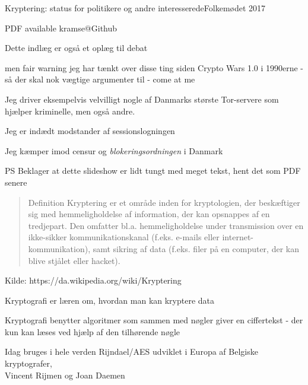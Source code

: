 \documentclass[20pt,landscape,a4paper,footrule]{foils}
\begin{document}

\mytitlepage
{Kryptering: status for politikere og andre interesserede}{Folkemødet 2017}

\centerline{\footnotesize
 PDF available kramse@Github}

\LogoOn

%


Dette indlæg er også et oplæg til debat

men fair warning jeg har tænkt over disse ting siden Crypto Wars
1.0 i 1990erne
- så der skal nok vægtige argumenter til - come at me \smiley

Jeg driver eksempelvis velvilligt nogle af Danmarks største Tor-servere
som hjælper kriminelle, men også andre.

Jeg er indædt modstander af sessionslogningen

Jeg kæmper imod censur og \emph{blokeringsordningen} i Danmark

PS Beklager at dette slideshow er lidt tungt med meget tekst, hent det som PDF senere


\begin{quote}
Definition
Kryptering er et område inden for kryptologien, der beskæftiger sig med
hemmeligholdelse af information, der kan opsnappes af en tredjepart. Den
omfatter bl.a. hemmeligholdelse under transmission over en ikke-sikker
kommunikationskanal (f.eks. e-mails eller internet-kommunikation), samt
sikring af data (f.eks. filer på en computer, der kan blive stjålet eller hacket).
\end{quote}
Kilde: https://da.wikipedia.org/wiki/Kryptering



\begin{list1}
\item Kryptografi er læren om, hvordan man kan kryptere data
\item Kryptografi benytter algoritmer som sammen med nøgler giver en
  ciffertekst - der kun kan læses ved hjælp af den tilhørende nøgle
\end{list1}


Idag bruges i hele verden Rijndael/AES udviklet i Europa af Belgiske kryptografer, \\
Vincent Rijmen og Joan Daemen
\end{document}
